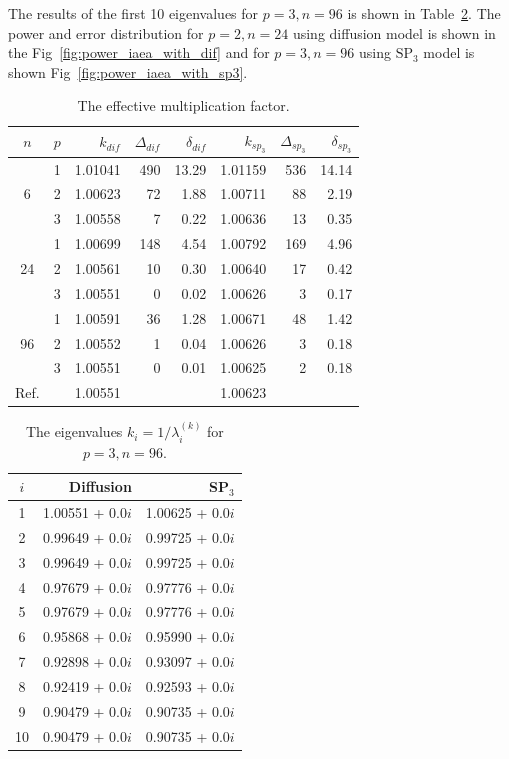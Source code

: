 \documentclass[authoryear]{elsarticle}
\begin{document}
The results of the first 10 eigenvalues for $ p = 3, n = 96 $ is shown in Table~\ref{tab:iaea_with_lambda_10}.
The power and error distribution for $p = 2, n = 24$ using diffusion model is shown in the Fig~\ref{fig:power_iaea_with_dif} and for $p = 3, n = 96$ using $\mathrm{SP_3}$ model is shown Fig~\ref{fig:power_iaea_with_sp3}.

\begin{table}[h]
\caption{The effective multiplication factor.}
\label{tab:iaea_with_lambda}
\begin{center}
\begin{tabular}{c c r r r r r r}
\hline
$n$ & $p$ & $k_{dif}$ & $\Delta_{dif}$ & $\delta_{dif}$ &$k_{sp_3}$& $\Delta_{sp_3}$ & $\delta_{sp_3}$ \\
\hline
	& 1	& 1.01041& 490&13.29& 1.01159& 536& 14.14\\
6	& 2	& 1.00623&  72& 1.88& 1.00711&  88&  2.19\\
	& 3	& 1.00558&   7& 0.22& 1.00636&  13&  0.35\\ 
\hline
	& 1	& 1.00699& 148& 4.54& 1.00792& 169&  4.96\\
24& 2	& 1.00561&  10& 0.30& 1.00640&  17&  0.42\\
	& 3	& 1.00551&   0& 0.02& 1.00626&   3&  0.17\\ 
\hline
	& 1	& 1.00591&  36& 1.28& 1.00671&  48&  1.42\\
96& 2	& 1.00552&   1& 0.04& 1.00626&   3&  0.18\\
	& 3	& 1.00551&   0& 0.01& 1.00625&   2&  0.18\\ 
\hline
Ref.&   & 1.00551&    &     & 1.00623&     &\\ 
\hline
\end{tabular}
\end{center}
\end{table}


\begin{table}[h]
\caption{The eigenvalues $k_i=1/\lambda_i^{(k)}$ for $p=3, n=96$.}
\label{tab:iaea_with_lambda_10}
\begin{center}
\begin{tabular}{c r r}
\hline
$i$ & Diffusion & SP$_3$  \\
\hline
1 & 1.00551 + 0.0$i$ & 1.00625 + 0.0$i$\\
2 & 0.99649 + 0.0$i$ & 0.99725 + 0.0$i$\\
3 & 0.99649 + 0.0$i$ & 0.99725 + 0.0$i$\\
4 & 0.97679 + 0.0$i$ & 0.97776 + 0.0$i$\\
5 & 0.97679 + 0.0$i$ & 0.97776 + 0.0$i$\\
6 & 0.95868 + 0.0$i$ & 0.95990 + 0.0$i$\\
7 & 0.92898 + 0.0$i$ & 0.93097 + 0.0$i$\\
8 & 0.92419 + 0.0$i$ & 0.92593 + 0.0$i$\\
9 & 0.90479 + 0.0$i$ & 0.90735 + 0.0$i$\\
10 & 0.90479 + 0.0$i$ & 0.90735 + 0.0$i$\\
\hline
\end{tabular}
\end{center}
\end{table}
\end{document}
